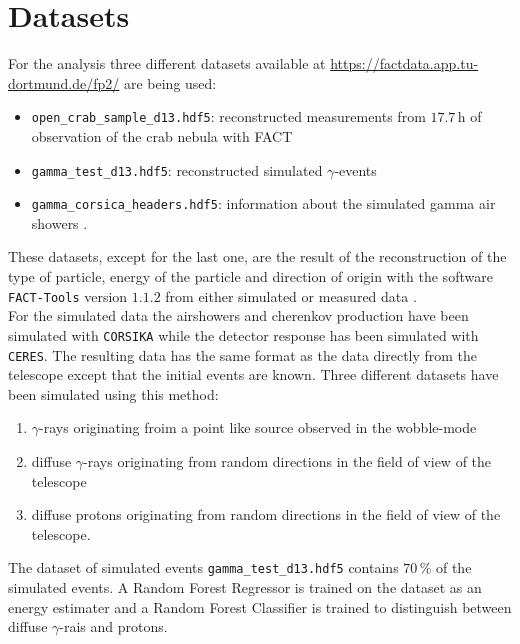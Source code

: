 \section{Datasets}
\label{sec:Durchführung}
For the analysis three different datasets available at \href{https://factdata.app.tu-dortmund.de/fp2/}{https://factdata.app.tu-dortmund.de/fp2/} are being used: 
\begin{itemize}
    \item \texttt{open\_crab\_sample\_d13.hdf5}: reconstructed measurements from $17.7 \, \text{h}$ of observation of the crab nebula with FACT
    \item \texttt{gamma\_test\_d13.hdf5}: reconstructed simulated $\gamma$-events
    \item \texttt{gamma\_corsica\_headers.hdf5}: information about the simulated gamma air showers .
\end{itemize}
These datasets, except for the last one, are the result of the reconstruction of the type of particle, energy of the particle and direction 
of origin with the software \texttt{FACT-Tools} version $1.1.2$ from either simulated or measured data \cite{FACT-tools}. \\
For the simulated data the airshowers and cherenkov production have been simulated with \texttt{CORSIKA}\cite{CORSIKA} while the detector response has been simulated with 
\texttt{CERES}. The resulting data has the same format as the data directly from the telescope except that the initial events are known. 
Three different datasets have been simulated using this method:
\begin{enumerate}
    \item $\gamma$-rays originating froim a point like source observed in the wobble-mode
    \item diffuse $\gamma$-rays originating from random directions in the field of view of the telescope
    \item diffuse protons originating from random directions in the field of view of the telescope.
\end{enumerate}
The dataset of simulated events \texttt{gamma\_test\_d13.hdf5} contains $70 \, \%$ of the simulated events.
A Random Forest Regressor is trained on the dataset as an energy estimater and a Random Forest Classifier is trained to distinguish between diffuse 
$\gamma$-rais and protons.

